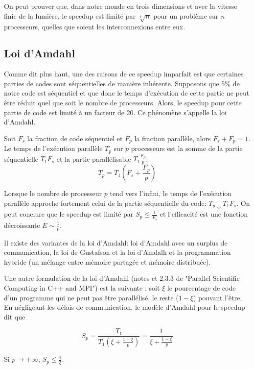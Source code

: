	On peut prouver que, dans notre monde en trois dimensions et avec la vitesse finie de la lumière, le speedup est limité par $\sqrt[4]{n}$ pour un problème sur \textit{n} processeurs, quelles que soient les interconnexions entre eux.
	
	\subsection{Loi d'Amdahl}
	Comme dit plus haut, une des raisons de ce speedup imparfait est que certaines parties de codes sont séquentielles de manière inhérente. Supposons que 5\% de notre code est séquentiel et que donc le temps d'exécution de cette partie ne peut être réduit quel que soit le nombre de processeurs. Alors, le speedup pour cette partie de code est limité à un facteur de 20. Ce phénomène s'appelle la loi d'Amdahl.
	
	Soit $F_s$ la fraction de code séquentiel et $F_p$ la fraction parallèle, alors $F_s + F_p = 1$. Le temps de l'exécution parallèle $T_p$ sur $p$ processeurs est la somme de la partie séquentielle $T_1F_s$ et la partie parallélisable $T_1\frac{F_p}{p}$:\\
	
	$$T_{p} = T_{1}(F_{s} + \frac{F_{p}}{p})$$
	
	Lorsque le nombre de processeur $p$ tend vers l'infini, le temps de l'exécution parallèle approche fortement celui de la partie séquentielle du code: $T_p \downarrow T_1F_s$. On peut conclure que le speedup est limité par $S_p \leq \frac{1}{F_s}$ et l'efficacité est une fonction décroissante $E \sim \frac{1}{p}$.
	
	Il existe des variantes de la loi d'Amdahl: loi d'Amdahl avec un surplus de communication, la loi de Gustafson et la loi d'Amdalh et la programmation hybride (un mélange entre mémoire partagée et mémoire distribuée).
	
	Une autre formulation de la loi d'Amdahl (notes et 2.3.3 de "Parallel Scientific Computing in C++ and MPI") est la suivante : soit $\xi$ le pourcentage de code d'un programme qui ne peut pas être parallélisé, le reste ($1 - \xi$) pouvant l'être. En négligeant les délais de communication, le modèle d'Amdahl pour le speedup dit que
	
	$$S_p = \frac{T_1}{T_1 (\xi + \frac{1 - \xi}{p})} = \frac{1}{\xi + \frac{1 - \xi}{p}}$$
	
	
	Si $p \rightarrow + \infty$, $S_p \leq \frac{1}{\xi}$.
	
